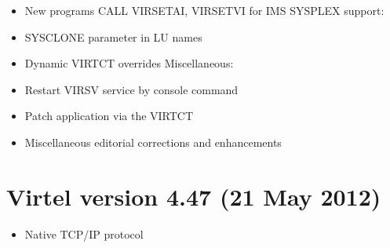 \documentclass[letterpaper,10pt,english]{sphinxmanual}
\begin{document}
\begin{itemize}
\item {} 
New programs CALL VIRSETAI, VIRSETVI for IMS SYSPLEX support:

\item {} 
SYSCLONE parameter in LU names

\item {} 
Dynamic VIRTCT overrides Miscellaneous:

\item {} 
Restart VIRSV service by console command

\item {} 
Patch application via the VIRTCT

\item {} 
Miscellaneous editorial corrections and enhancements

\end{itemize}


\section{Virtel version 4.47 (21 May 2012)}
\label{\detokenize{Installation_Guide:virtel-version-4-47-21-may-2012}}
\begin{itemize}
\item {} 
Native TCP/IP protocol

\end{itemize}
\end{document}
